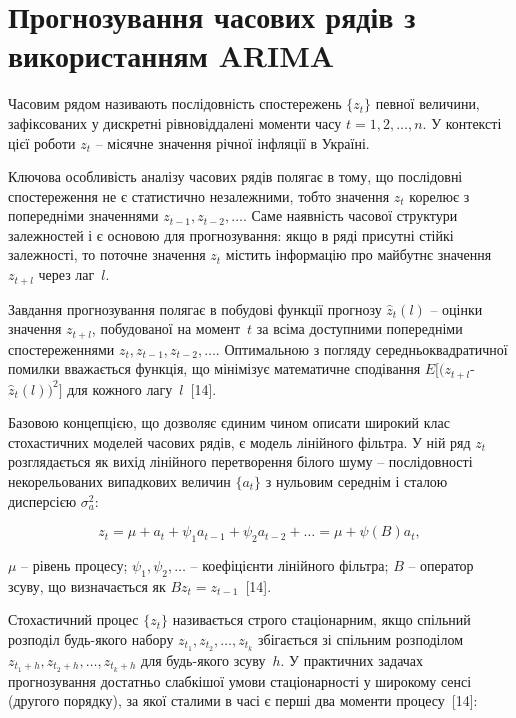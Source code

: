 \documentclass{bachelor_thesis}
\begin{document}
\section{Прогнозування часових рядів з використанням ARIMA}

Часовим рядом називають послідовність спостережень $\{z_t\}$ певної величини, зафіксованих у дискретні рівновіддалені моменти часу $t = 1, 2, \ldots, n$. У контексті цієї роботи $z_t$ -- місячне значення річної інфляції в Україні.

Ключова особливість аналізу часових рядів полягає в тому, що послідовні спостереження не є статистично незалежними, тобто значення $z_t$ корелює з попередніми значеннями $z_{t-1}, z_{t-2}, \ldots$. Саме наявність часової структури залежностей і є основою для прогнозування: якщо в ряді присутні стійкі залежності, то поточне значення $z_t$ містить інформацію про майбутнє значення $z_{t+l}$ через лаг~$l$.

Завдання прогнозування полягає в побудові функції прогнозу $\hat{z}_t(l)$ -- оцінки значення $z_{t+l}$, побудованої на момент~$t$ за всіма доступними попередніми спостереженнями $z_t, z_{t-1}, z_{t-2}, \ldots$. Оптимальною з погляду середньоквадратичної помилки вважається функція, що мінімізує математичне сподівання $E[(z_{t+l} $-$ \hat{z}_t(l))^2]$ для кожного лагу~$l$~[14].

Базовою концепцією, що дозволяє єдиним чином описати широкий клас стохастичних моделей часових рядів, є модель лінійного фільтра. У ній ряд $z_t$ розглядається як вихід лінійного перетворення білого шуму -- послідовності некорельованих випадкових величин $\{a_t\}$ з нульовим середнім і сталою дисперсією $\sigma_a^2$:

\begin{equation*}
z_t = \mu + a_t + \psi_1 a_{t-1} + \psi_2 a_{t-2} + \ldots = \mu + \psi(B) a_t,
\end{equation*}

 $\mu$ -- рівень процесу; $\psi_1, \psi_2, \ldots$ -- коефіцієнти лінійного фільтра; $B$ -- оператор зсуву, що визначається як $B z_t = z_{t-1}$~[14].

Стохастичний процес $\{z_t\}$ називається строго стаціонарним, якщо спільний розподіл будь-якого набору $z_{t_1}, z_{t_2}, \ldots, z_{t_k}$ збігається зі спільним розподілом $z_{t_1+h}, z_{t_2+h}, \ldots, z_{t_k+h}$ для будь-якого зсуву~$h$. У практичних задачах прогнозування достатньо слабкішої умови стаціонарності у широкому сенсі (другого порядку), за якої сталими в часі є перші два моменти процесу~[14]:
\end{document}

